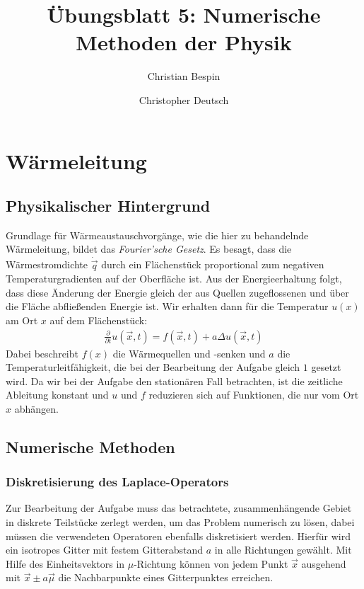 \documentclass[10pt,a4paper]{article}
\author{Christian Bespin \and Christopher Deutsch}
\title{Übungsblatt 5: Numerische Methoden der Physik}
\begin{document}
\maketitle

\setcounter{section}{4}

\section{Wärmeleitung}

\subsection{Physikalischer Hintergrund}
Grundlage für Wärmeaustauschvorgänge, wie die hier zu behandelnde Wärmeleitung, bildet das \emph{Fourier'sche Gesetz}. Es besagt, dass die Wärmestromdichte $\dot{\vec{q}}$ durch ein Flächenstück proportional zum negativen Temperaturgradienten auf der Oberfläche ist. Aus der Energieerhaltung folgt, dass diese Änderung der Energie gleich der aus Quellen zugeflossenen und über die Fläche abfließenden Energie ist. Wir erhalten dann für die Temperatur $u(x)$ am Ort $x$ auf dem Flächenstück:
\begin{align}  
\frac{\partial}{\partial t}u(\vec{x},t)=f(\vec{x},t)+ a \Delta u(\vec{x},t)
\end{align}
Dabei beschreibt $f(x)$ die Wärmequellen und -senken und $a$ die Temperaturleitfähigkeit, die bei der Bearbeitung der Aufgabe gleich $1$ gesetzt wird. Da wir bei der Aufgabe den stationären Fall betrachten, ist die zeitliche Ableitung konstant und $u$ und $f$ reduzieren sich auf Funktionen, die nur vom Ort $x$ abhängen.

\subsection{Numerische Methoden}
\subsubsection{Diskretisierung des Laplace-Operators}
Zur Bearbeitung der Aufgabe muss das betrachtete, zusammenhängende Gebiet in diskrete Teilstücke zerlegt werden, um das Problem numerisch zu lösen, dabei müssen die verwendeten Operatoren ebenfalls diskretisiert werden. Hierfür wird ein isotropes Gitter mit festem Gitterabstand $a$ in alle Richtungen gewählt. Mit Hilfe des Einheitsvektors in $\mu$-Richtung können von jedem Punkt $\vec{x}$ ausgehend mit $\vec{x} \pm a\vec{\mu}$ die Nachbarpunkte eines Gitterpunktes erreichen.
\end{document}
